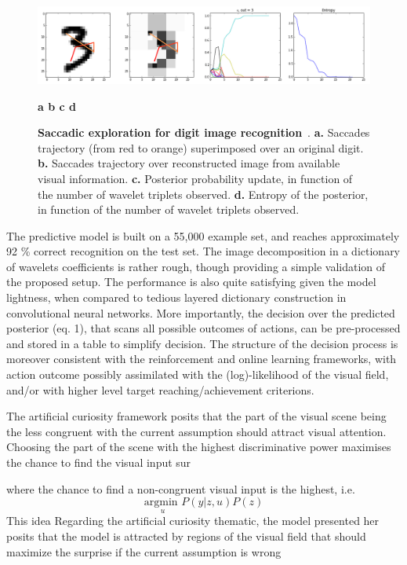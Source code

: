 \documentclass[12pt,twoside,openright]{article}
\begin{document}
	\begin{figure}[t!]
		\centerline{
				\includegraphics[width = \linewidth]{img/figure.png} 
		}
		\centerline{\bf a \hspace{4cm} b \hspace{4cm} c \hspace{4cm} d}
		\caption{\footnotesize{{\bf Saccadic exploration for digit image recognition}~. {\bf a.} Saccades trajectory (from red to orange) superimposed over an original digit. {\bf b.} Saccades trajectory over reconstructed image from available visual information. {\bf c.} Posterior probability update, in function of the number of wavelet triplets observed. {\bf d.} Entropy of the posterior, in function of the number of wavelet triplets observed. } }
	\end{figure}
	
	The predictive model is built on a 55,000 example set, and reaches approximately 92 \% correct recognition on the test set. The image decomposition in a dictionary of wavelets coefficients is rather rough, though providing a simple validation of the proposed setup. The performance is also quite satisfying given the model lightness, when compared to tedious layered dictionary construction in convolutional neural networks. 
	More importantly, the decision over the predicted posterior (eq. 1), that scans all possible outcomes of actions, can be pre-processed and stored in a table to simplify decision. The structure of the decision process is moreover consistent with the reinforcement and online learning frameworks, with action outcome possibly assimilated with the (log)-likelihood of the visual field, and/or with higher level target reaching/achievement criterions.
	
	{\color{magenta} The artificial curiosity framework posits that the part of the visual scene being the less congruent with the current assumption should attract visual attention. Choosing the part of the scene with the highest discriminative power maximises the chance to find the visual input sur
		
		where the chance to find a non-congruent visual input is the highest, i.e.
		$$ \underset{u}{\text{argmin }} P(y|z,u) P(z)$$
		This idea 
		Regarding the artificial curiosity thematic, the model presented her posits that the model is attracted by regions of the visual field that should maximize the surprise if the current assumption is wrong}
	
\end{document}
